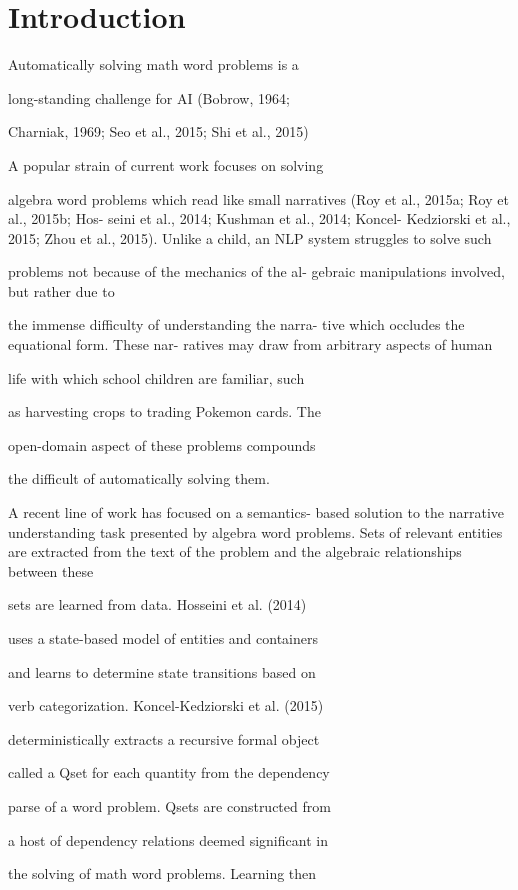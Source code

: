 \section{Introduction}
Automatically solving math word problems is a

long-standing challenge for AI (Bobrow, 1964;

Charniak, 1969; Seo et al., 2015; Shi et al., 2015)

A popular strain of current work focuses on solving

algebra word problems which read like small narratives (Roy et al., 2015a; Roy et al., 2015b; Hos-
seini et al., 2014; Kushman et al., 2014; Koncel-
Kedziorski et al., 2015; Zhou et al., 2015). Unlike a child, an NLP system struggles to solve such

problems not because of the mechanics of the al-
gebraic manipulations involved, but rather due to

the immense difficulty of understanding the narra-
tive which occludes the equational form. These nar-
ratives may draw from arbitrary aspects of human

life with which school children are familiar, such

as harvesting crops to trading Pokemon cards. The

open-domain aspect of these problems compounds

the difficult of automatically solving them.

A recent line of work has focused on a semantics-
based solution to the narrative understanding task presented by algebra word problems. Sets of relevant entities are extracted from the text of the problem and the algebraic relationships between these

sets are learned from data. Hosseini et al. (2014)

uses a state-based model of entities and containers

and learns to determine state transitions based on

verb categorization. Koncel-Kedziorski et al. (2015)

deterministically extracts a recursive formal object

called a Qset for each quantity from the dependency

parse of a word problem. Qsets are constructed from

a host of dependency relations deemed significant in

the solving of math word problems. Learning then


